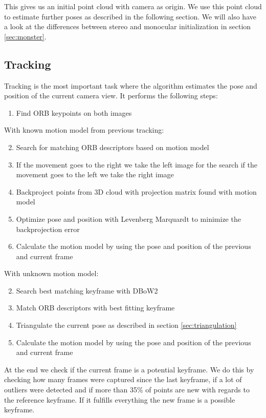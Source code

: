 \documentclass[11pt,a4paper,titlepage,oneside]{report}
\begin{document}
This gives us an initial point cloud with camera as origin. We use this point cloud to estimate further poses as described in the following section. We will also have a look at the differences between stereo and monocular initialization in section \ref{sec:monster}.

\subsection{Tracking}

Tracking is the most important task where the algorithm estimates the pose and position of the current camera view. It performs the following steps:
\begin{enumerate}
	\item Find ORB keypoints on both images
\end{enumerate}

With known motion model from previous tracking:
\begin{enumerate}
	\setcounter{enumi}{1}
	\item Search for matching ORB descriptors based on motion model
	\item If the movement goes to the right we take the left image for the search if the movement goes to the left we take the right image
	\item Backproject points from 3D cloud with projection matrix found with motion model
	\item Optimize pose and position with Levenberg Marquardt \cite{levenbergmarquardt} to minimize the backprojection error
	\item Calculate the motion model by using the pose and position of the previous and current frame
\end{enumerate}

With unknown motion model:
\begin{enumerate}
	\setcounter{enumi}{1}
	\item Search best matching keyframe with DBoW2 \cite{dbow}
	\item Match ORB descriptors with best fitting keyframe
	\item Triangulate the current pose as described in section \ref{sec:triangulation}
	\item Calculate the motion model by using the pose and position of the previous and current frame
\end{enumerate}

At the end we check if the current frame is a potential keyframe. We do this by checking how many frames were captured since the last keyframe, if a lot of outliers were detected and if more than 35\% of points are new with regards to the reference keyframe. If it fulfills everything the new frame is a possible keyframe.\\
\end{document}
